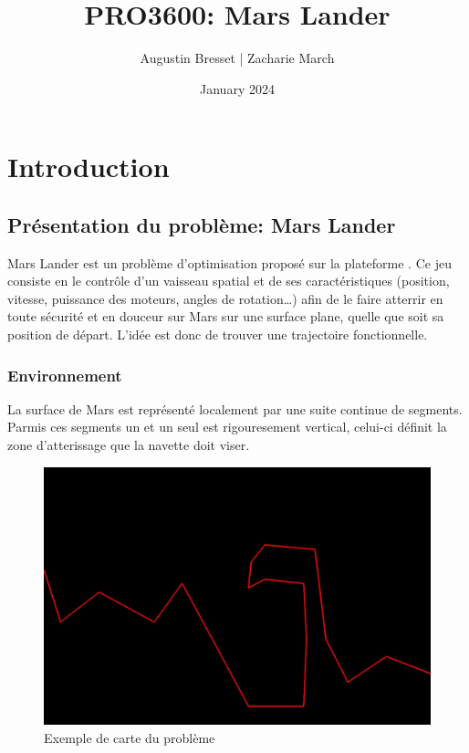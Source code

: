 \documentclass[french,a4paper,10pt,twocolumn]{article}
\title{PRO3600: Mars Lander}
\author{Augustin Bresset | Zacharie March}
\date{January 2024}
\begin{document}
\onecolumn
\maketitle
\tableofcontents
\twocolumn
\pagebreak

\section{Introduction}

\subsection{Présentation du problème: Mars Lander}

Mars Lander est un problème d'optimisation proposé sur la plateforme \cite[]{codingame_mars_lander}.
Ce jeu consiste en le contrôle d'un vaisseau spatial et de ses caractéristiques (position, vitesse, puissance des moteurs, angles de rotation…) 
afin de le faire atterrir en toute sécurité et en douceur sur Mars sur une surface plane, quelle que soit sa position de départ. 
L'idée est donc de trouver une trajectoire fonctionnelle.

\subsubsection{Environnement}

La surface de Mars est représenté localement par une suite continue de segments.
Parmis ces segments un et un seul est rigouresement vertical, celui-ci définit la zone d'atterissage que la navette doit viser.

\begin{figure}[h]
    \centering
    \includegraphics[scale=0.2]{images/cave_map.jpeg}
    \caption{Exemple de carte du problème}
    \label{fig:map}
\end{figure}
\end{document}
